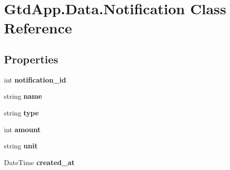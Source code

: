 \hypertarget{class_gtd_app_1_1_data_1_1_notification}{}\section{Gtd\+App.\+Data.\+Notification Class Reference}
\label{class_gtd_app_1_1_data_1_1_notification}
\subsection*{Properties}
\begin{DoxyCompactItemize}
\item 
\mbox{\label{class_gtd_app_1_1_data_1_1_notification_a629cc1b5894cfcc107786481ae39e835}} 
int {\bfseries notification\+\_\+id}
\item 
\mbox{\label{class_gtd_app_1_1_data_1_1_notification_a801d990c4dbe4b8b677f1ce29787e08e}} 
string {\bfseries name}
\item 
\mbox{\label{class_gtd_app_1_1_data_1_1_notification_ad56d2a1cf9a736ed614e47d2e133bd40}} 
string {\bfseries type}
\item 
\mbox{\label{class_gtd_app_1_1_data_1_1_notification_a845a3fea1513fc5fe478dec062016069}} 
int {\bfseries amount}
\item 
\mbox{\label{class_gtd_app_1_1_data_1_1_notification_ab7acbe0b03730d6658ecf831f25470d2}} 
string {\bfseries unit}
\item 
\mbox{\label{class_gtd_app_1_1_data_1_1_notification_a04401e116659b10ee680872f82d32a51}} 
Date\+Time {\bfseries created\+\_\+at}

\end{DoxyCompactItemize}
